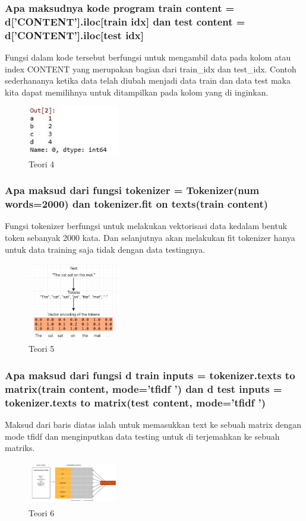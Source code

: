 \subsubsection{Apa maksudnya kode program train content = d[’CONTENT’].iloc[train idx] dan test content = d[’CONTENT’].iloc[test idx]}
\hfill\break
Fungsi dalam kode tersebut berfungsi untuk mengambil data pada kolom atau index CONTENT yang merupakan bagian dari train\_idx dan test\_idx. Contoh sederhananya ketika data telah diubah menjadi data train dan data test maka kita dapat memilihnya untuk ditampilkan pada kolom yang di inginkan. 

\begin{figure}[H]
\centering
	\includegraphics[width=4cm]{figures/1174067/7/4.jpg}
\caption{Teori 4}
\end{figure}

\subsubsection{Apa maksud dari fungsi tokenizer = Tokenizer(num words=2000) dan tokenizer.fit on texts(train content)}
\hfill\break
Fungsi tokenizer berfungsi untuk melakukan vektorisasi data kedalam bentuk token sebanyak 2000 kata. Dan selanjutnya akan melakukan fit tokenizer hanya untuk data training saja tidak dengan data testingnya.
\begin{figure}[H]
\centering
	\includegraphics[width=4cm]{figures/1174067/7/5.jpg}
\caption{Teori 5}
\end{figure}

\subsubsection{Apa maksud dari fungsi d train inputs = tokenizer.texts to matrix(train content, mode=’tfidf ’) dan d test inputs = tokenizer.texts to matrix(test content, mode=’tfidf ’)}
\hfill\break
Maksud dari baris diatas ialah untuk memasukkan text ke sebuah matrix dengan mode tfidf dan menginputkan data testing untuk di terjemahkan ke sebuah matriks.
\begin{figure}[H]
\centering
	\includegraphics[width=4cm]{figures/1174067/7/6.jpg}
\caption{Teori 6}
\end{figure}

